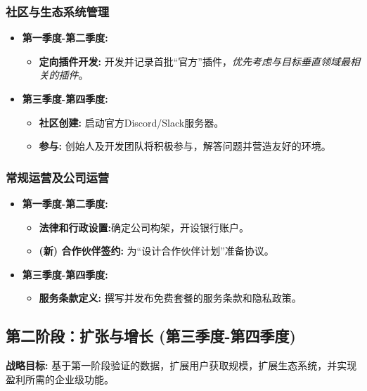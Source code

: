 \documentclass[11点, A4纸, 单面]{article}
\begin{document}
\subsubsection{社区与生态系统管理}
\begin{itemize}[leftmargin=*]
    \item \textbf{第一季度-第二季度:}
    \begin{itemize}
        \item \textbf{定向插件开发:} 开发并记录首批“官方”插件，\textit{优先考虑与目标垂直领域最相关的插件}。
    \end{itemize}
    \item \textbf{第三季度-第四季度:}
    \begin{itemize}
        \item \textbf{社区创建:} 启动官方Discord/Slack服务器。
        \item \textbf{参与:} 创始人及开发团队将积极参与，解答问题并营造友好的环境。
    \end{itemize}
\end{itemize}

\subsubsection{常规运营及公司运营}
\begin{itemize}[leftmargin=*]
    \item \textbf{第一季度-第二季度:}
    \begin{itemize}
        \item \textbf{法律和行政设置:}确定公司构架，开设银行账户。
        \item \textbf{(新) 合作伙伴签约:} 为“设计合作伙伴计划”准备协议。
    \end{itemize}
    \item \textbf{第三季度-第四季度:}
    \begin{itemize}
        \item \textbf{服务条款定义:} 撰写并发布免费套餐的服务条款和隐私政策。
    \end{itemize}
\end{itemize}

\clearpage

\subsection{第二阶段：扩张与增长 (第三季度-第四季度)}
\textbf{战略目标:} 基于第一阶段验证的数据，扩展用户获取规模，扩展生态系统，并实现盈利所需的企业级功能。
\end{document}
